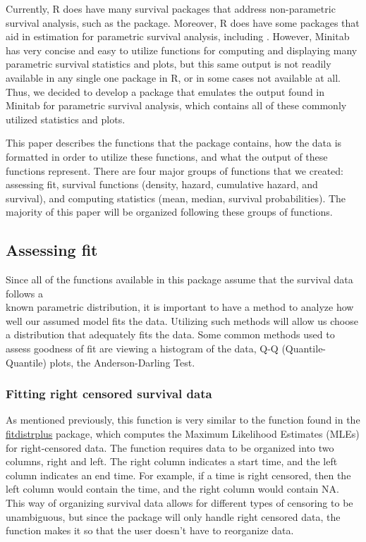 Currently, R does have many survival packages that address
non-parametric survival analysis, such as the  package.
Moreover, R does have some packages that aid in estimation for
parametric survival analysis, including . However,
Minitab has very concise and easy to utilize functions for computing and
displaying many parametric survival statistics and plots, but this same
output is not readily available in any single one package in R, or in
some cases not available at all. Thus, we decided to develop a package
that emulates the output found in Minitab for parametric survival
analysis, which contains all of these commonly utilized statistics and
plots.

This paper describes the functions that the  package
contains, how the data is formatted in order to utilize these functions,
and what the output of these functions represent. There are four major
groups of functions that we created: assessing fit, survival functions
(density, hazard, cumulative hazard, and survival), and computing
statistics (mean, median, survival probabilities). The majority of this
paper will be organized following these groups of functions.

\hypertarget{assessing-fit}{%
\subsection{Assessing fit}\label{assessing-fit}}

Since all of the functions available in this package assume that the
survival data follows a\\
known parametric distribution, it is important to have a method to
analyze how well our assumed model fits the data. Utilizing such methods
will allow us choose a distribution that adequately fits the data. Some
common methods used to assess goodness of fit are viewing a histogram of
the data, Q-Q (Quantile-Quantile) plots, the Anderson-Darling Test.

\hypertarget{fitting-right-censored-survival-data}{%
\subsubsection{Fitting right censored survival
data}\label{fitting-right-censored-survival-data}}

As mentioned previously, this function is very similar to the function
 found in the
\href{https://cran.r-project.org/web/packages/fitdistrplus/index.html}{fitdistrplus}
package, which computes the Maximum Likelihood Estimates (MLEs) for
right-censored data. The  function requires data to be
organized into two columns, right and left. The right column indicates a
start time, and the left column indicates an end time. For example, if a
time is right censored, then the left column would contain the time, and
the right column would contain NA. This way of organizing survival data
allows for different types of censoring to be unambiguous, but since the
 package will only handle right censored data, the
 function makes it so that the user doesn't have to
reorganize data.

